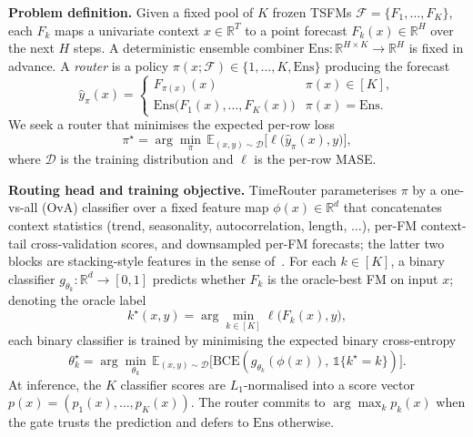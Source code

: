 \documentclass{article}
\theoremstyle{plain}
\theoremstyle{definition}
\theoremstyle{remark}
\begin{document}
\textbf{Problem definition.} Given a fixed pool of $K$ frozen TSFMs $\mathcal{F} = \{F_1, \dots, F_K\}$, each $F_k$ maps a univariate context $x \in \mathbb{R}^{T}$ to a point forecast $F_k(x) \in \mathbb{R}^{H}$ over the next $H$ steps. A deterministic ensemble combiner $\mathrm{Ens}: \mathbb{R}^{H \times K} \to \mathbb{R}^{H}$ is fixed in advance. A \emph{router} is a policy $\pi(x; \mathcal{F}) \in \{1, \dots, K, \mathrm{Ens}\}$ producing the forecast
\begin{equation}
\hat{y}_\pi(x) =
\begin{cases}
F_{\pi(x)}(x) & \pi(x) \in [K], \\
\mathrm{Ens}\bigl(F_1(x), \dots, F_K(x)\bigr) & \pi(x) = \mathrm{Ens}.
\end{cases}
\label{eq:router}
\end{equation}
We seek a router that minimises the expected per-row loss
\begin{equation}
\pi^\star = \arg\min_\pi\, \mathbb{E}_{(x, y) \sim \mathcal{D}}\!\bigl[\ell\bigl(\hat{y}_\pi(x), y\bigr)\bigr],
\end{equation}
where $\mathcal{D}$ is the training distribution and $\ell$ is the per-row MASE.

\textbf{Routing head and training objective.} TimeRouter parameterises $\pi$ by a one-vs-all (OvA) classifier over a fixed feature map $\phi(x) \in \mathbb{R}^{d}$ that concatenates context statistics (trend, seasonality, autocorrelation, length, $\dots$), per-FM context-tail cross-validation scores, and downsampled per-FM forecasts; the latter two blocks are stacking-style features in the sense of~\citet{wolpert1992stacking}. For each $k \in [K]$, a binary classifier $g_{\theta_k}: \mathbb{R}^{d} \to [0, 1]$ predicts whether $F_k$ is the oracle-best FM on input $x$; denoting the oracle label
\begin{equation}
k^\star(x, y) = \arg\min_{k \in [K]} \ell\bigl(F_k(x), y\bigr),
\end{equation}
each binary classifier is trained by minimising the expected binary cross-entropy
\begin{equation}
\theta_k^\star = \arg\min_{\theta_k}\, \mathbb{E}_{(x,y)\sim\mathcal D}\bigl[\mathrm{BCE}(g_{\theta_k}(\phi(x)),\, \mathbb{1}\{k^\star = k\})\bigr].
\label{eq:bce}
\end{equation}
At inference, the $K$ classifier scores are $L_1$-normalised into a score vector $p(x) = (p_1(x), \dots, p_K(x))$. The router commits to $\arg\max_k p_k(x)$ when the gate trusts the prediction and defers to $\mathrm{Ens}$ otherwise.
\end{document}
